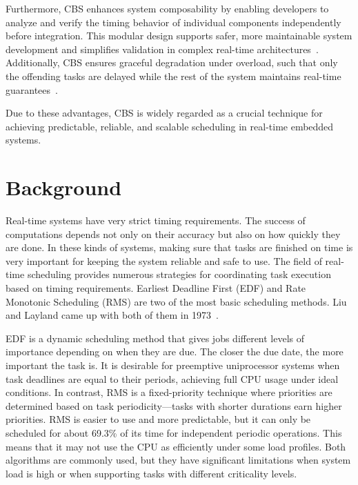 \documentclass[conference]{IEEEtran}
\begin{document}
Furthermore, CBS enhances system composability by enabling developers to analyze and verify the timing behavior of individual components independently before integration. This modular design supports safer, more maintainable system development and simplifies validation in complex real-time architectures~\cite{buttazzo2011hard}. Additionally, CBS ensures graceful degradation under overload, such that only the offending tasks are delayed while the rest of the system maintains real-time guarantees~\cite{cucinotta2009providing}.

Due to these advantages, CBS is widely regarded as a crucial technique for achieving predictable, reliable, and scalable scheduling in real-time embedded systems.



\section{\textbf{Background}}

Real-time systems have very strict timing requirements. The success of computations depends not only on their accuracy but also on how quickly they are done. In these kinds of systems, making sure that tasks are finished on time is very important for keeping the system reliable and safe to use. The field of real-time scheduling provides numerous strategies for coordinating task execution based on timing requirements. Earliest Deadline First (EDF) and Rate Monotonic Scheduling (RMS) are two of the most basic scheduling methods. Liu and Layland came up with both of them in 1973~\cite{liu1973scheduling}.

EDF is a dynamic scheduling method that gives jobs different levels of importance depending on when they are due. The closer the due date, the more important the task is. It is desirable for preemptive uniprocessor systems when task deadlines are equal to their periods, achieving full CPU usage under ideal conditions. In contrast, RMS is a fixed-priority technique where priorities are determined based on task periodicity—tasks with shorter durations earn higher priorities. RMS is easier to use and more predictable, but it can only be scheduled for about 69.3\% of its time for independent periodic operations. This means that it may not use the CPU as efficiently under some load profiles. Both algorithms are commonly used, but they have significant limitations when system load is high or when supporting tasks with different criticality levels.
\end{document}
